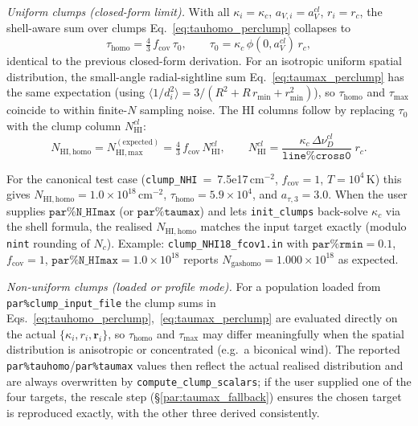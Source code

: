 \documentclass[english,a4paper]{my_memo}
\begin{document}
\textit{Uniform clumps (closed-form limit).}
With all $\kappa_i = \kappa_c$, $a_{V,i} = a_V^{cl}$, $r_i = r_c$, the
shell-aware sum over clumps
Eq.~\eqref{eq:tauhomo_perclump} collapses to
\begin{equation}
  \tau_\mathrm{homo} = \tfrac{4}{3}\,f_\mathrm{cov}\,\tau_0,
  \qquad
  \tau_0 = \kappa_c\,\phi(0,a_V^{cl})\,r_c,
\label{eq:tauhomo_shell}
\end{equation}
identical to the previous closed-form derivation.  For an isotropic
uniform spatial distribution, the small-angle radial-sightline sum
Eq.~\eqref{eq:taumax_perclump} has the same expectation (using
$\langle 1/d_i^2\rangle = 3/(R^2+R\,r_\mathrm{min}+r_\mathrm{min}^2)$),
so $\tau_\mathrm{homo}$ and $\tau_\mathrm{max}$ coincide to within
finite-$N$ sampling noise.  The HI columns follow by replacing $\tau_0$
with the clump column $N_\mathrm{HI}^{cl}$:
\begin{equation}
  N_\mathrm{HI,homo} = N_\mathrm{HI,max}^\mathrm{(expected)}
    = \tfrac{4}{3}\,f_\mathrm{cov}\,N_\mathrm{HI}^{cl},\qquad
  N_\mathrm{HI}^{cl} = \frac{\kappa_c\,\Delta\nu_D^{cl}}{\texttt{line\%cross0}}\;r_c.
\end{equation}
\begin{sloppypar}
For the canonical test case (\texttt{clump\_NHI}~=~7.5e17\,cm$^{-2}$,
$f_\mathrm{cov}=1$, $T=10^4$\,K) this gives
$N_\mathrm{HI,homo} = 1.0\times10^{18}\,\mathrm{cm}^{-2}$,
$\tau_\mathrm{homo} = 5.9\times10^{4}$, and $a_{\tau,3} = 3.0$.  When
the user supplies $\texttt{par\%N\_HImax}$ (or $\texttt{par\%taumax}$)
and lets \texttt{init\_clumps} back-solve $\kappa_c$ via the shell
formula, the realised $N_\mathrm{HI,homo}$ matches the input target
exactly (modulo \texttt{nint} rounding of $N_c$).  Example:
\texttt{clump\_NHI18\_fcov1.in} with $\texttt{par\%rmin} = 0.1$,
$f_\mathrm{cov} = 1$, $\texttt{par\%N\_HImax} = 1.0\times10^{18}$
reports $N_\mathrm{gashomo} = 1.000\times10^{18}$ as expected.
\end{sloppypar}

\textit{Non-uniform clumps (loaded or profile mode).}
For a population loaded from \texttt{par\%clump\_input\_file} the clump
sums in Eqs.~\eqref{eq:tauhomo_perclump},~\eqref{eq:taumax_perclump} are
evaluated directly on the actual $\{\kappa_i, r_i, \mathbf{r}_i\}$, so
$\tau_\mathrm{homo}$ and $\tau_\mathrm{max}$ may differ meaningfully
when the spatial distribution is anisotropic or concentrated (e.g.\ a
biconical wind).  The reported \texttt{par\%tauhomo}/\texttt{par\%taumax}
values then reflect the actual realised distribution and are always
overwritten by \texttt{compute\_clump\_scalars}; if the user supplied
one of the four targets, the rescale step
(\S\ref{par:taumax_fallback}) ensures the chosen target is reproduced
exactly, with the other three derived consistently.
\end{document}

